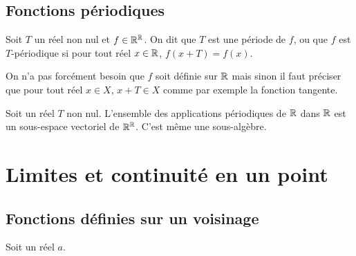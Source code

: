 \subsection{Fonctions périodiques}

\begin{defdef}
  Soit $T$ un réel non nul et $f \in \mathbb{R}^{\mathbb{R}}$. On dit que $T$ est une période de $f$, ou que $f$ est $T$-périodique si pour tout réel $x \in \mathbb{R}$, $f(x+T)=f(x)$. 
\end{defdef}
On n'a pas forcément besoin que $f$ soit définie sur $\mathbb{R}$ mais sinon il faut préciser que pour tout réel $x \in X$, $x+T\in X$ comme par exemple la fonction tangente.
%
\begin{prop}
  Soit un réel $T$ non nul. L'ensemble des applications périodiques de $\mathbb{R}$ dans $\mathbb{R}$ est un sous-espace vectoriel de $\mathbb{R}^{\mathbb{R}}$. C'est même une sous-algèbre.
\end{prop}
%
\section{Limites et continuité en un point}

\subsection{Fonctions définies sur un voisinage}

Soit un réel $a$.

